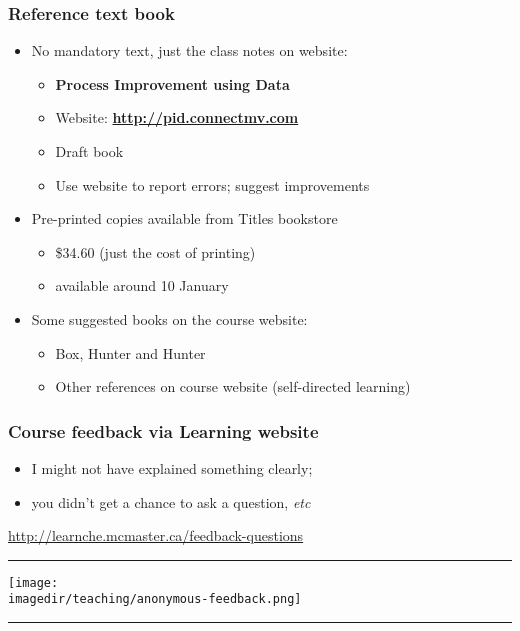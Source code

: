 \begin{frame}\frametitle{Reference text book}
	
	\begin{itemize}
		\item	No mandatory text, just the class notes on website: 
		\begin{itemize}
			\item	\textbf{Process Improvement using Data} 
			\item	Website: \textbf{\href{http://pid.connectmv.com}{http://pid.connectmv.com}} 
			\item	Draft book 
			\item	Use website to report errors; suggest improvements 
		\end{itemize}
	\end{itemize}
	\begin{itemize}
		\item	Pre-printed copies available from Titles bookstore 
		\begin{itemize}
			\item	\$34.60 (just the cost of printing) 
			\item	available around 10 January 
		\end{itemize}
	\end{itemize}
	\begin{itemize}
		\item	Some suggested books on the course website: 
		\begin{itemize}
			\item	Box, Hunter and Hunter
			\item	Other references on course website (self-directed learning)
		\end{itemize}
	\end{itemize}
\end{frame}

\begin{frame}\frametitle{Course feedback via Learning website}
	\begin{itemize}
		\item	I might not have explained something clearly; 
		\item	you didn't get a chance to ask a question, \emph{etc}		
	\end{itemize}
	\href{http://learnche.mcmaster.ca/feedback-questions}{http://learnche.mcmaster.ca/feedback-questions}
	\vspace{12pt}
	\hrule
	\begin{center}
		\texttt{[image: \\imagedir/teaching/anonymous-feedback.png]}
	\end{center}
	\hrule
\end{frame}

